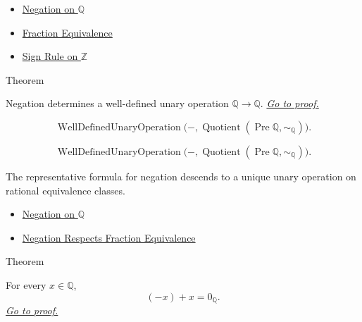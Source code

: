 \begin{dependencies}
\begin{itemize}
  \item \hyperref[def:negation-on-q-classes]{Negation on $\mathbb{Q}$}
  \item \hyperref[def:fraction-equivalence]{Fraction Equivalence}
  \item \hyperref[cor:sign-rule-on-z]{Sign Rule on $\mathbb{Z}$}
\end{itemize}
\end{dependencies}

\begin{theorembox}{Theorem}
\begin{theorem}
\label{thm:negation-on-q-well-defined}
Negation determines a well-defined unary operation $\mathbb{Q}\to\mathbb{Q}$.
\hyperref[prf:negation-on-q-well-defined]{\textit{Go to proof.}}
\end{theorem}
\end{theorembox}

\begin{remark*}
\[
\operatorname{WellDefinedUnaryOperation}
\bigl(-,\operatorname{Quotient}(\operatorname{Pre}\mathbb{Q},\sim_{\mathbb{Q}})\bigr).
\]
\end{remark*}

\begin{remark*}
\[
\operatorname{WellDefinedUnaryOperation}
\bigl(-,\operatorname{Quotient}(\operatorname{Pre}\mathbb{Q},\sim_{\mathbb{Q}})\bigr).
\]
\end{remark*}

\begin{remark*}[Interpretation]
The representative formula for negation descends to a unique unary operation
on rational equivalence classes.
\end{remark*}

\begin{dependencies}
\begin{itemize}
  \item \hyperref[def:negation-on-q-classes]{Negation on $\mathbb{Q}$}
  \item \hyperref[lem:negation-on-q-respects-equivalence]{Negation Respects Fraction Equivalence}
\end{itemize}
\end{dependencies}

\begin{theorembox}{Theorem}
\begin{theorem}
\label{thm:negation-left-additive-inverse-on-q}
For every $x\in\mathbb{Q}$,
\[
(-x)+x=0_{\mathbb{Q}}.
\]
\hyperref[prf:negation-left-additive-inverse-on-q]{\textit{Go to proof.}}
\end{theorem}
\end{theorembox}


